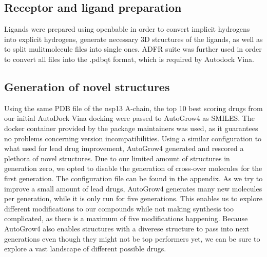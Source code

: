 \documentclass[11pt, letterpaper, titlepage]{article}
\begin{document}
\subsection{Receptor and ligand preparation}
Ligands were prepared using openbable in order to convert implicit hydrogens into explicit hydrogens, generate necessary 3D structures of the ligands, as well as to split mulitmolecule files into single ones. ADFR suite was further used in order to convert all files into the .pdbqt format, which is required by Autodock Vina. 
 
\subsection{Generation of novel structures}
Using the same PDB file of the nsp13 A-chain, the top 10 best scoring drugs from our initial AutoDock Vina docking were passed to AutoGrow4 as SMILES. The docker container provided by the package maintainers was used, as it guarantees no problems concerning version incompatibilities. Using a similar configuration to what  used for lead drug improvement, AutoGrow4 generated and rescored a plethora of novel structures. Due to our limited amount of structures in generation zero, we opted to disable the generation of cross-over molecules for the first generation. The configuration file can be found in the appendix. As we try to improve a small amount of lead drugs, AutoGrow4 generates many new molecules per generation, while it is only run for five generations. This enables us to explore different modifications to our compounds while not making synthesis too complicated, as there is a maximum of five modifications happening. Because AutoGrow4 also enables structures with a diverese structure to pass into next generations even though they might not be top performers yet, we can be sure to explore a vast landscape of different possible drugs.
\end{document}
